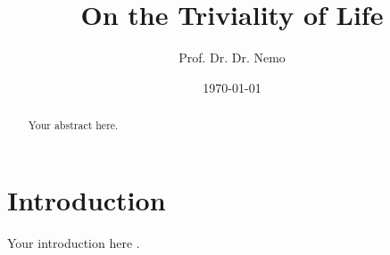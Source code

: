 \documentclass{article}
\title{On the Triviality of Life}
\author{Prof. Dr. Dr. Nemo}
\date{\today}
\begin{document}
\maketitle

\begin{abstract}
Your abstract here.
\end{abstract}

\section{Introduction}
Your introduction here \cite{example}.



\end{document}
